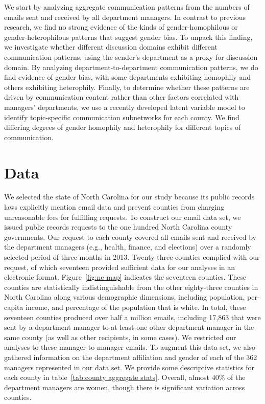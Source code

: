 \documentclass{pnastwo}
\begin{document}
\begin{article}
We start by analyzing aggregate communication patterns from the
numbers of emails sent and received by all department managers. In
contrast to previous research, we find no strong evidence of the kinds
of gender-homophilous or gender-heterophilous patterns that suggest
gender bias. To unpack this finding, we investigate whether different
discussion domains exhibit different communication patterns, using the
sender's department as a proxy for discussion domain. By analyzing
department-to-department communication patterns, we do find evidence
of gender bias, with some departments exhibiting homophily and others
exhibiting heterophily. Finally, to determine whether these patterns
are driven by communication content rather than other factors
correlated with managers' departments, we use a recently developed
latent variable model to identify topic-specific communication
subnetworks for each county. We find differing degrees of gender
homophily and heterophily for different topics of communication. 


\section{Data}

We selected the state of North Carolina for our study because its
public records laws explicitly mention email data and prevent counties
from charging unreasonable fees for fulfilling requests. To construct
our email data set, we issued public records requests to the one
hundred North Carolina county governments. Our request to each county
covered all emails sent and received by the department managers (e.g.,
health, finance, and elections) over a randomly selected period of
three months in 2013. Twenty-three
counties complied with our request, of which seventeen provided
sufficient data for our analyses in an electronic
format. Figure~\ref{fig:nc map} indicates the seventeen
counties. These counties are statistically indistinguishable from
the other eighty-three counties in North Carolina along various
demographic dimensions, including population, per-capita income, and
percentage of the population that is white. In total, these seventeen
counties produced over half a million emails, including 17,863 that
were sent by a department manager to at least one other department
manager in the same county (as well as other recipients, in some
cases). We restricted our analyses to these manager-to-manager
emails. To augment this data set, we also gathered information on the
department affiliation and gender of each of the 362 managers
represented in our data set. We provide some descriptive statistics
for each county in table~\ref{tab:county aggregate stats}. Overall,
almost 40\% of the department managers are women, though there is
significant variation across counties.


\end{article}
\end{document}
